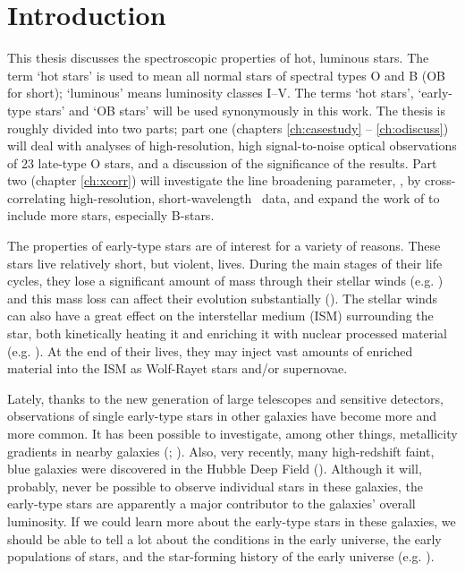 \chapter{Introduction}
\label{ch:intro}

This thesis discusses the spectroscopic properties of hot, luminous
stars.  The term `hot stars' is used to mean all normal stars of
spectral types O and B (OB for short); `luminous' means luminosity classes
I--V. The terms `hot stars', `early-type stars' and `OB
stars' will be used synonymously in this work. The thesis is
roughly divided into two parts; part one (chapters 
\ref{ch:casestudy} -- \ref{ch:odiscuss}) will deal with analyses
of high-resolution, high signal-to-noise optical
observations of 23 late-type O stars, and a discussion of the significance
of the results. Part two (chapter
\ref{ch:xcorr}) will investigate the line broadening parameter, \vsini,
by cross-correlating high-resolution, short-wavelength \iue\ data, and
expand the work of  to include more stars, especially
B-stars.

The properties of early-type stars are of interest for a variety of
reasons. These stars live relatively short, but violent, lives. During
the main stages of their life cycles, they lose a significant amount
of mass through their stellar winds (e.g. \cite{pu:96}) and this mass
loss can affect their evolution substantially
(\cite{1987A&A...182..243M}).  The stellar winds can also have a great
effect on the interstellar medium (ISM) surrounding the star, both
kinetically heating it and enriching it with nuclear processed material
(e.g. \cite{ca:93}). At the end of their lives, they may inject vast
amounts of enriched material into the ISM as Wolf-Rayet stars and/or
supernovae.

Lately, thanks to the new generation of large telescopes and sensitive
detectors, observations of single early-type stars in other galaxies
have become more and more common. It has been possible to investigate,
among other things, metallicity gradients in nearby galaxies
(\cite{mo:97}; \cite{mo:98}). Also, very recently, many high-redshift
faint, blue galaxies were discovered in the Hubble Deep
Field (\cite{hdf}). Although it will, probably, never be possible to
observe individual stars in these galaxies, the early-type stars are
apparently a major contributor to the galaxies' overall
luminosity. If we could learn more about the early-type
stars in these galaxies, we should be able to tell a lot about the
conditions in the early universe, the early populations of stars, and
the star-forming history of the early universe (e.g. \cite{fr:98}).

